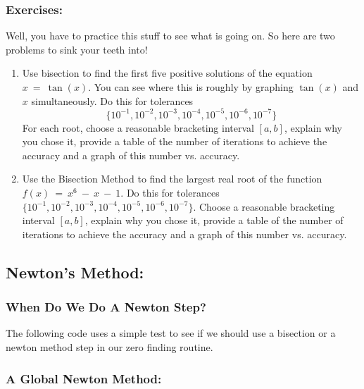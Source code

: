 \documentclass[11pt]{SelfArxOneColBMN}
\begin{document}
\subsubsection{Exercises:}

Well, you have to practice this stuff to see what is going on.
So here are two problems to sink your teeth into!

\begin{enumerate}
\item Use bisection to find the first five positive solutions of the
      equation $x \: = \: \tan(x)$.  You can see where this is
      roughly by graphing $\tan(x)$ and $x$ simultaneously.
      Do this for tolerances 
      $$\{10^{-1}, 10^{-2}, 10^{-3}, 10^{-4}, 10^{-5}, 10^{-6}, 10^{-7}\}$$
      For each root, choose a reasonable bracketing interval $[a,b]$,
      explain why you chose it,
      provide a table of the number of iterations to achieve the
      accuracy and a graph of this number vs. accuracy.
\item Use the Bisection Method to find the largest real root of the function
      $f(x) \: = \: x^6 \: - \: x \: - \: 1$. 
      Do this for tolerances \\
      $\{10^{-1}, 10^{-2}, 10^{-3}, 10^{-4}, 10^{-5}, 10^{-6}, 10^{-7}\}$.
      Choose a reasonable bracketing interval $[a,b]$,
      explain why you chose it,
      provide a table of the number of iterations to achieve the
      accuracy and a graph of this number vs. accuracy.     
\end{enumerate}

\subsection{Newton's Method:}

\subsubsection{When Do We Do A Newton Step?}

The following code uses a simple test to see
if we should use a bisection or a newton method
step in our zero finding routine.

\singlespacing

\onehalfspacing

\subsubsection{A Global Newton Method:}
\end{document}
